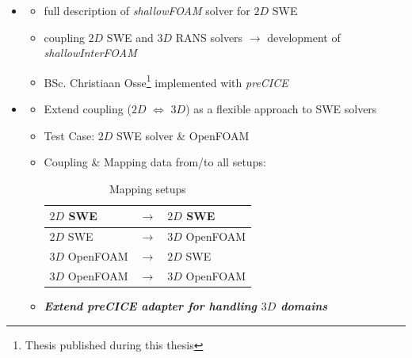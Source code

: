 \begin{frame}

\begin{multicols}{2}
\begin{itemize}
\item<1->[]    
 \begin{itemize}
   \setlength\itemsep{2em}
  \item  full description of \textit{shallowFOAM}  solver for $2D$ SWE \cite{mintgen}
 \item  coupling $2D$ SWE and $3D$ RANS solvers $\rightarrow$ development of \textit{shallowInterFOAM} \cite{mintgen}
 \item BSc. Christiaan Osse\footnote{Thesis published during this thesis} implemented \cite{mintgen} with \textit{preCICE}
 \end{itemize}
    
 \vfill\columnbreak

\item<2->[]
 \begin{itemize}
    \setlength\itemsep{2em}

 \item<3-> Extend \cite{mintgen} coupling ($2D$ $\Longleftrightarrow$ $3D$) as a flexible approach to SWE solvers
 \item<4-> Test Case: $2D$ SWE solver \& OpenFOAM 
 \item<5-> Coupling \& Mapping data from/to all setups: \vspace{0.4cm}
\begin{table}[]
\begin{tabular}{|lll|}
\hline
$2D$ SWE       & $\rightarrow$ & $2D$ SWE       \\ \hline
$2D$ SWE       & $\rightarrow$ & $3D$ OpenFOAM \\ \hline
$3D$ OpenFOAM & $\rightarrow$ & $2D$ SWE       \\ \hline
$3D$ OpenFOAM & $\rightarrow$ & $3D$ OpenFOAM \\ \hline
\end{tabular}
\caption{Mapping setups}
\label{table:1}
\end{table}
\item<6-> \textbf{\textit{Extend preCICE adapter for handling $3D$ domains}}
\end{itemize}
\end{itemize}
\end{multicols}


\end{frame}



